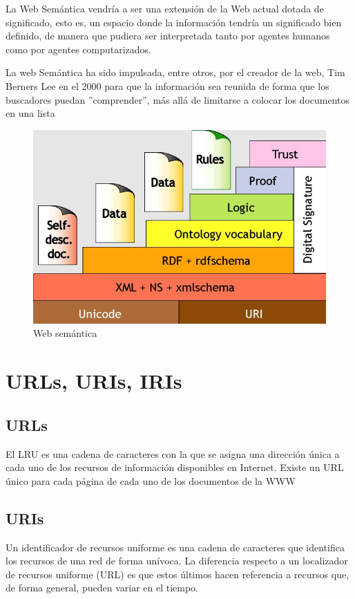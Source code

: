 \documentclass[conference]{IEEEtran}
\begin{document}
La Web Semántica vendría a ser una extensión de la Web actual dotada de significado, esto es, un espacio donde la información tendría un significado bien definido, de manera que pudiera ser interpretada tanto por agentes humanos como por agentes computarizados.

\vspace{0.2cm}

La web Semántica ha sido impulsada, entre otros, por el creador de la web, Tim Berners Lee en el 2000 para que la información sea reunida de forma que los buscadores puedan ''comprender'', más allá de limitarse a colocar los documentos en una lista

\begin{figure}[h]
	\centering
	\includegraphics[scale=0.40]{imagenes/imagen1.jpeg} 
	\caption{Web semántica \cite{b4}}
\end{figure}
\section{URLs, URIs, IRIs}
\subsection{URLs}
El LRU es una cadena de caracteres con la que se asigna una dirección única a cada uno de los recursos de información disponibles en Internet. Existe un URL único para cada página de cada uno de los documentos de la WWW

\subsection{URIs}
Un identificador de recursos uniforme es una cadena de caracteres que identifica los recursos de una red de forma unívoca. La diferencia respecto a un localizador de recursos uniforme (URL) es que estos últimos hacen referencia a recursos que, de forma general, pueden variar en el tiempo. 
\end{document}
